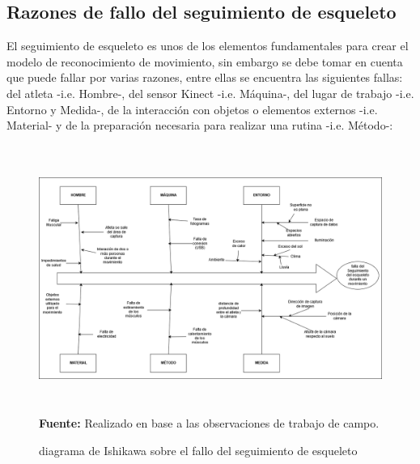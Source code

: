 \begin{landscape}
\section{Razones de fallo del seguimiento de esqueleto}
El seguimiento de esqueleto es unos de los  elementos fundamentales para crear el modelo de reconocimiento de movimiento, sin embargo se debe tomar en cuenta que puede fallar por varias razones, entre ellas se encuentra las siguientes fallas: del atleta -i.e. Hombre-, del sensor Kinect -i.e. M\'aquina-, del lugar de trabajo -i.e. Entorno y  Medida-, de la interacci\'on  con objetos o elementos externos -i.e. Material- y de la preparaci\'on necesaria para realizar una rutina -i.e. M\'etodo-:
\begin{figure}[H]
	\caption{diagrama de Ishikawa sobre el fallo del seguimiento de esqueleto}
	\label{fig:ishikawa}
	\centering
	\includegraphics[width=560px,height=330px]{graphics/resultados/Ishi-SeguimientoDeEsqueleto.PNG} \\
	\textbf{Fuente:} Realizado en base a las observaciones de trabajo de campo.
\end{figure}
\end{landscape}
